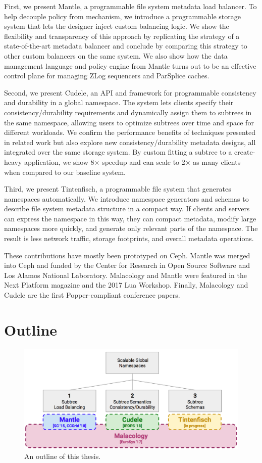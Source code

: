 First, we present Mantle, a programmable file system metadata load balancer.
To help decouple policy from mechanism, we introduce a programmable storage
system that lets the designer inject custom balancing logic. We show the
flexibility and transparency of this approach by replicating the strategy of a
state-of-the-art metadata balancer and conclude by comparing this strategy to
other custom balancers on the same system. We also show how the data management
language and policy engine from Mantle turns out to be an effective control
plane for managing ZLog sequencers and ParSplice caches.  

Second, we present Cudele, an API and framework for programmable consistency
and durability in a global namespace. The system lets clients specify their
consistency/durability requirements and dynamically assign them to subtrees in
the same namespace, allowing users to optimize subtrees over time and space for
different workloads. We confirm the performance benefits of techniques
presented in related work but also explore new consistency/durability metadata
designs, all integrated over the same storage system. By custom fitting a
subtree to a create- heavy application, we show 8× speedup and can scale to
2\(\times\) as many clients when compared to our baseline system.

Third, we present Tintenfisch, a programmable file system that generates
namespaces automatically. We introduce namespace generators and schemas to
describe file system metadata structure in a compact way. If clients and
servers can express the namespace in this way, they can compact metadata,
modify large namespaces more quickly, and generate only relevant parts of the
namespace. The result is less network traffic, storage footprints, and overall
metadata operations.

These contributions have mostly been prototyped on Ceph. Mantle was merged into
Ceph and funded by the Center for Research in Open Source Software and Los
Alamos National Laboratory. Malacology and Mantle were featured in the Next
Platform magazine and the 2017 Lua Workshop. Finally, Malacology and Cudele are
the first Popper-compliant conference papers.

\section{Outline}

\begin{figure}[tb]
  \centering
  \includegraphics[width=1\textwidth]{./chapters/overview.png}
  \caption{An outline of this thesis.}
  \label{fig:thesis-overview}
\end{figure}

